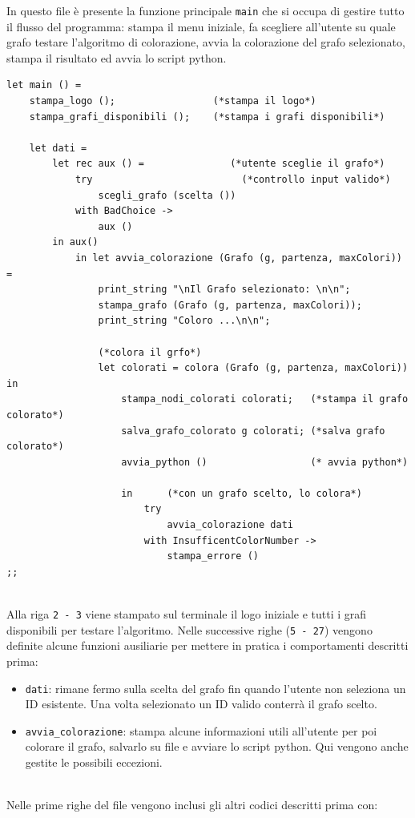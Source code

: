 In questo file è presente la funzione principale \lstinline[style=cmd]|main| che si occupa di gestire tutto il flusso del programma: stampa il menu iniziale, fa scegliere all'utente su quale grafo testare l'algoritmo di colorazione, avvia la colorazione del grafo selezionato, stampa il risultato ed avvia lo script python.
\newpage
\begin{lstlisting}[style=caml, caption={Parte del codice contenuto in main.ml }]
let main () = 
	stampa_logo ();                 (*stampa il logo*)
	stampa_grafi_disponibili ();    (*stampa i grafi disponibili*)

	let dati = 
		let rec aux () =               (*utente sceglie il grafo*)
			try                          (*controllo input valido*)
				scegli_grafo (scelta ())
			with BadChoice -> 
				aux () 
		in aux() 
			in let avvia_colorazione (Grafo (g, partenza, maxColori)) = 
				print_string "\nIl Grafo selezionato: \n\n"; 
				stampa_grafo (Grafo (g, partenza, maxColori)); 
				print_string "Coloro ...\n\n";
				 
				(*colora il grfo*)
				let colorati = colora (Grafo (g, partenza, maxColori)) in     
					stampa_nodi_colorati colorati;   (*stampa il grafo colorato*)
					salva_grafo_colorato g colorati; (*salva grafo colorato*)
					avvia_python ()                  (* avvia python*)

					in      (*con un grafo scelto, lo colora*)
						try                                
							avvia_colorazione dati  
						with InsufficentColorNumber -> 
							stampa_errore ()
;;

\end{lstlisting}
\ \\
Alla riga \lstinline[style=cmd]|2 - 3| viene stampato sul terminale il logo iniziale e tutti i grafi disponibili per testare l'algoritmo. Nelle successive righe (\lstinline[style=cmd]|5 - 27|) vengono definite alcune funzioni ausiliarie per mettere in pratica i comportamenti descritti prima:

\begin{itemize}
	\item \lstinline[style=cmd]|dati|: rimane fermo sulla scelta del grafo fin quando l'utente non seleziona un ID esistente. Una volta selezionato un ID valido conterrà il grafo scelto. %
	\item \lstinline[style=cmd]|avvia_colorazione|: stampa alcune informazioni utili all'utente per poi colorare il grafo, salvarlo su file e avviare lo script python. Qui vengono anche gestite le possibili eccezioni.
\end{itemize}
\ \\
Nelle prime righe del file vengono inclusi gli altri codici descritti prima con:

